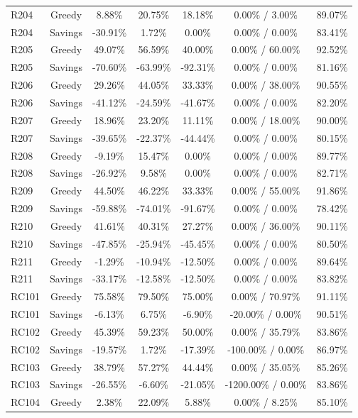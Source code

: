 \documentclass[conference]{IEEEtran}
\begin{document}
\begin{table}[htbp]
{\begin{tabular}{lcccccc}
R204 & Greedy & 8.88\% & 20.75\% & 18.18\% & 0.00\% / 3.00\% & 89.07\% \\
R204 & Savings & -30.91\% & 1.72\% & 0.00\% & 0.00\% / 0.00\% & 83.41\% \\
R205 & Greedy & 49.07\% & 56.59\% & 40.00\% & 0.00\% / 60.00\% & 92.52\% \\
R205 & Savings & -70.60\% & -63.99\% & -92.31\% & 0.00\% / 0.00\% & 81.16\% \\
R206 & Greedy & 29.26\% & 44.05\% & 33.33\% & 0.00\% / 38.00\% & 90.55\% \\
R206 & Savings & -41.12\% & -24.59\% & -41.67\% & 0.00\% / 0.00\% & 82.20\% \\
R207 & Greedy & 18.96\% & 23.20\% & 11.11\% & 0.00\% / 18.00\% & 90.00\% \\
R207 & Savings & -39.65\% & -22.37\% & -44.44\% & 0.00\% / 0.00\% & 80.15\% \\
R208 & Greedy & -9.19\% & 15.47\% & 0.00\% & 0.00\% / 0.00\% & 89.77\% \\
R208 & Savings & -26.92\% & 9.58\% & 0.00\% & 0.00\% / 0.00\% & 82.71\% \\
R209 & Greedy & 44.50\% & 46.22\% & 33.33\% & 0.00\% / 55.00\% & 91.86\% \\
R209 & Savings & -59.88\% & -74.01\% & -91.67\% & 0.00\% / 0.00\% & 78.42\% \\
R210 & Greedy & 41.61\% & 40.31\% & 27.27\% & 0.00\% / 36.00\% & 90.11\% \\
R210 & Savings & -47.85\% & -25.94\% & -45.45\% & 0.00\% / 0.00\% & 80.50\% \\
R211 & Greedy & -1.29\% & -10.94\% & -12.50\% & 0.00\% / 0.00\% & 89.64\% \\
R211 & Savings & -33.17\% & -12.58\% & -12.50\% & 0.00\% / 0.00\% & 83.82\% \\
RC101 & Greedy & 75.58\% & 79.50\% & 75.00\% & 0.00\% / 70.97\% & 91.11\% \\
RC101 & Savings & -6.13\% & 6.75\% & -6.90\% & -20.00\% / 0.00\% & 90.51\% \\
RC102 & Greedy & 45.39\% & 59.23\% & 50.00\% & 0.00\% / 35.79\% & 83.86\% \\
RC102 & Savings & -19.57\% & 1.72\% & -17.39\% & -100.00\% / 0.00\% & 86.97\% \\
RC103 & Greedy & 38.79\% & 57.27\% & 44.44\% & 0.00\% / 35.05\% & 85.26\% \\
RC103 & Savings & -26.55\% & -6.60\% & -21.05\% & -1200.00\% / 0.00\% & 83.86\% \\
RC104 & Greedy & 2.38\% & 22.09\% & 5.88\% & 0.00\% / 8.25\% & 85.10\% \\

\end{tabular}}
\end{table}
\end{document}
